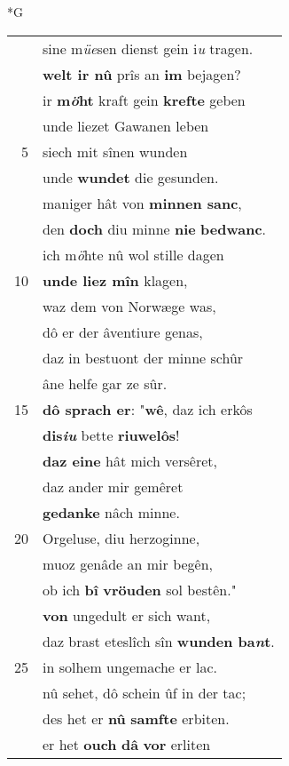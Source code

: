 \documentclass[8pt,a4paper,notitlepage]{article}
\begin{document}
\begin{table}[ht]
\begin{minipage}[t]{0.5\linewidth}
\small
\begin{center}*G
\end{center}
\begin{tabular}{rl}
 & sine m\textit{üe}sen dienst gein i\textit{u} tragen.\\ 
 & \textbf{welt ir nû} prîs an \textbf{im} bejagen?\\ 
 & ir \textbf{m\textit{ö}ht} kraft gein \textbf{krefte} geben\\ 
 & unde liezet Gawanen leben\\ 
5 & siech mit sînen wunden\\ 
 & unde \textbf{wundet} die gesunden.\\ 
 & maniger hât von \textbf{minnen sanc},\\ 
 & den \textbf{doch} diu minne \textbf{nie} \textbf{bedwanc}.\\ 
 & ich m\textit{ö}hte nû wol stille dagen\\ 
10 & \textbf{unde liez mîn} klagen,\\ 
 & waz dem von Norwæge was,\\ 
 & dô er der âventiure genas,\\ 
 & daz in bestuont der minne schûr\\ 
 & âne helfe gar ze sûr.\\ 
15 & \textbf{dô sprach er}: "\textbf{wê}, daz ich erkôs\\ 
 & \textbf{dis\textit{iu}} bette \textbf{riuwelôs}!\\ 
 & \textbf{daz eine} hât mich versêret,\\ 
 & daz ander mir gemêret\\ 
 & \textbf{gedanke} nâch minne.\\ 
20 & Orgeluse, diu herzoginne,\\ 
 & muoz genâde an mir begên,\\ 
 & ob ich \textbf{bî} \textbf{vröuden} sol bestên."\\ 
 & \textbf{von} ungedult er sich want,\\ 
 & daz brast eteslîch sîn \textbf{wunden ba\textit{n}t}.\\ 
25 & in solhem ungemache er lac.\\ 
 & nû sehet, dô schein ûf in der tac;\\ 
 & des het er \textbf{nû} \textbf{samfte} erbiten.\\ 
 & er het \textbf{ouch} \textbf{dâ} \textbf{vor} erliten\\ 

\end{tabular}
\end{minipage}
\end{table}
\end{document}

